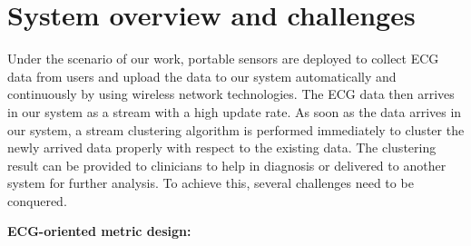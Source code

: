 \documentclass[conference]{IEEEtran}
\begin{document}
%



\section{System overview and challenges}
Under the scenario of our work, portable sensors are deployed to collect ECG data from users and upload the data to our system automatically and continuously by using wireless network technologies. The ECG data then arrives in our system as a stream with a high update rate. As soon as the data arrives in our system, a stream clustering algorithm is performed immediately to cluster the newly arrived data properly with respect to the existing data. The clustering result can be provided to clinicians to help in diagnosis or delivered to another system for further analysis. To achieve this, several challenges need to be conquered.


\textbf{ECG-oriented metric design:}
\end{document}
